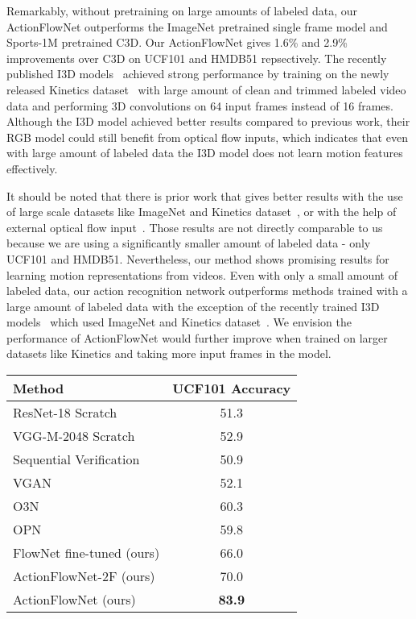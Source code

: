 \documentclass[10pt,twocolumn,letterpaper]{article}
\begin{document}
Remarkably, without pretraining on large amounts of labeled data, our ActionFlowNet outperforms the ImageNet pretrained single frame model and Sports-1M pretrained C3D. Our ActionFlowNet gives 1.6\% and 2.9\% improvements over C3D on UCF101 and HMDB51 repsectively. 
The recently published I3D models~\cite{carreira2017quo} achieved strong performance by training on the newly released Kinetics dataset~\cite{kay2017kinetics} with large amount of clean and trimmed labeled video data and performing 3D convolutions on 64 input frames instead of 16 frames.
Although the I3D model achieved better results compared to previous work, their RGB model could still benefit from optical flow inputs, which indicates that even with large amount of labeled data the I3D model does not learn motion features effectively.

It should be noted that there is prior work that gives better results with the use of large scale datasets like ImageNet and Kinetics dataset~\cite{carreira2017quo}, or with the help of external optical flow input~\cite{simonyanZ14a}. Those results are not directly comparable to us because we are using a significantly smaller amount of labeled data - only UCF101 and HMDB51.
Nevertheless, our method shows promising results for learning motion representations from videos. Even with only a small amount of labeled data, our action recognition network outperforms methods trained with a large amount of labeled data with the exception of the recently trained I3D models~\cite{carreira2017quo} which used ImageNet and Kinetics dataset~\cite{kay2017kinetics}.
We envision the performance of ActionFlowNet would further improve when trained on larger datasets like Kinetics and taking more input frames in the model. 
  \vspace{-.5em}
\begin{center}
    \begin{tabular}{l|c}
      \hline
      Method & UCF101 Accuracy \\
    \hline\hline
    ResNet-18 Scratch         & 51.3 \\
    VGG-M-2048 Scratch~\cite{simonyanZ14a} & 52.9 \\
    Sequential Verification~\cite{misra2016shuffle} & 50.9 \\
    VGAN~\cite{vondrick2016generating} & 52.1 \\
    O3N~\cite{fernando2016self} & 60.3 \\
    OPN~\cite{lee2017unsupervised} & 59.8 \\
    \hline
    FlowNet fine-tuned (ours) & 66.0 \\
    ActionFlowNet-2F (ours)  & 70.0 \\
    \hline
    ActionFlowNet (ours)  & \textbf{83.9} \\
      \hline
    \end{tabular}
    \vspace{-1em}
\end{center}
\end{document}
